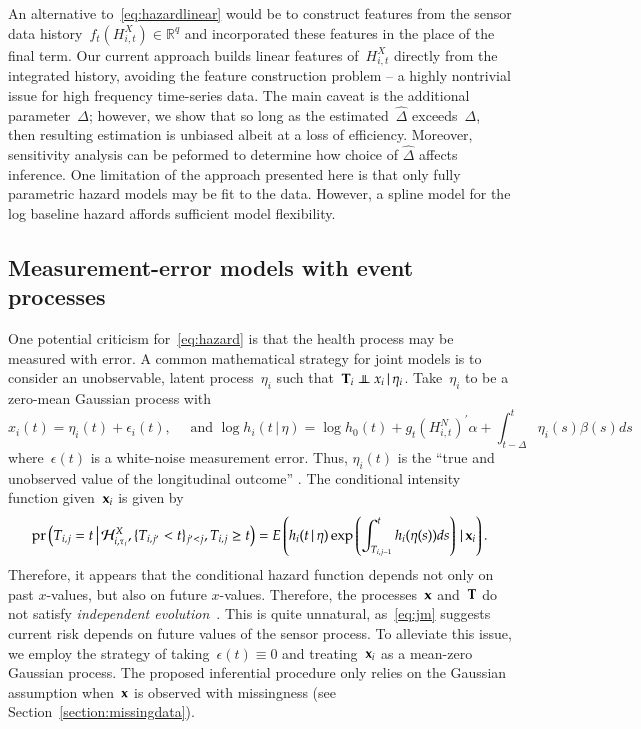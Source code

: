 \documentclass[11pt]{amsart}
\def\pr{\mathop{\text{pr}}\nolimits}
\def\pr{\mathop{\text{pr}}\nolimits}
\def\indep{\mathrel{\rlap{$\perp$}\kern1.6pt\mathord{\perp}}}
\def\H{\mathcal{H}}
\def\given{\, | \,}
\def\Given{\, \big | \,}
\def\bfx{{\bf x}}
\def\bfT{{\bf T}}
\begin{document}
An alternative to~\eqref{eq:hazardlinear} would be to construct
features from the sensor data history~$f_t ( H_{i,t}^{X}) \in
\mathbb{R}^q$ and incorporated these features in the place of the
final term. Our current approach builds linear features of~$H_{i,t}^X$
directly from the integrated history, avoiding the feature
construction problem -- a highly nontrivial issue for high frequency
time-series data.  The main caveat is the additional
parameter~$\Delta$; however, we show that so long as the
estimated~$\hat \Delta$ exceeds~$\Delta$, then resulting estimation is
unbiased albeit at a loss of efficiency.  Moreover, sensitivity
analysis can be peformed to determine how choice of $\hat \Delta$
affects inference.  One limitation of the approach presented here is
that only fully parametric hazard models may be fit to the data.
However, a spline model for the log baseline hazard affords sufficient
model flexibility.

\subsection{Measurement-error models with event processes}

One potential criticism for~\eqref{eq:hazard} is that the health
process may be measured with error.  
A common mathematical strategy for joint models is to consider an
unobservable, latent process~$\eta_i$ such that~$\bfT_i \indep x_i
\given \eta_i$. Take~$\eta_i$ to be a zero-mean Gaussian process with 
\begin{equation}\label{eq:jm}
x_i(t) = \eta_i (t) + \epsilon_i (t),\quad \text{ and } \log h_i (t
\given \eta ) = \log h_0 (t) + g_t \left( H_{i,t}^N \right)^{\prime}
\alpha + \int_{t-\Delta}^t \eta_i (s) \beta (s) ds
\end{equation}
where~$\epsilon (t)$ is a white-noise measurement error. Thus,
$\eta_i (t)$ is the ``true and unobserved value of the longitudinal
outcome'' \citep[Sec. 2.1, pp.3]{Rizopoulos2010}. The conditional intensity
function given~$\bfx_i$ is given by
\[
\pr \left ( T_{i,j} = t \Given \H_{i,\tau_i}^X, \{ T_{i,j^\prime} < t \}_{j^\prime <
  j}, T_{i,j} \geq t \right) = E \left( h_i (t \given \eta) \exp
\left( \int_{T_{i,j-1}}^t h_i (\eta (s)) ds \right) \given \bfx_i
\right).
\]
Therefore, it appears that the conditional hazard function depends 
not only on past $x$-values, but also on future $x$-values.
Therefore, the processes~$\bfx$ and~$\bfT$ do not satisfy
\emph{independent evolution}~\citep{DempseyPMCC2}.
This is quite unnatural, as~\eqref{eq:jm} suggests current risk
depends on future values of the sensor process.
To alleviate this issue, we employ the strategy of taking~$\epsilon
(t) \equiv 0$ and treating~$\bfx_i$ as a mean-zero Gaussian process.
The proposed inferential procedure only relies on the Gaussian
assumption when~$\bfx$ is observed with missingness (see
Section~\ref{section:missingdata}).
\end{document}
